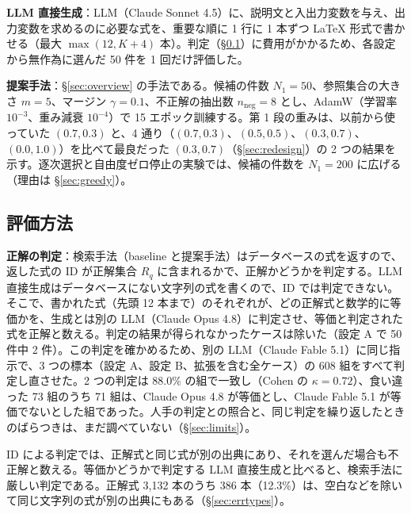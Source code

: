 \documentclass[a4j,dvipdfmx,11pt]{jresume}
\begin{document}
\textbf{LLM 直接生成}：LLM（Claude Sonnet 4.5）に、説明文と入出力変数を与え、出力変数を求めるのに必要な式を、重要な順に 1 行に 1 本ずつ \LaTeX{} 形式で書かせる（最大 $\max(12, K + 4)$ 本）。判定（\S\ref{sec:eval}）に費用がかかるため、各設定から無作為に選んだ 50 件を 1 回だけ評価した。

\textbf{提案手法}：\S\ref{sec:overview} の手法である。候補の件数 $N_1 = 50$、参照集合の大きさ $m = 5$、マージン $\gamma = 0.1$、不正解の抽出数 $n_{\mathrm{neg}} = 8$ とし、AdamW（学習率 $10^{-3}$、重み減衰 $10^{-4}$）で 15 エポック訓練する。第 1 段の重みは、以前から使っていた $(0.7, 0.3)$ と、4 通り（$(0.7, 0.3)$、$(0.5, 0.5)$、$(0.3, 0.7)$、$(0.0, 1.0)$）を比べて最良だった $(0.3, 0.7)$（\S\ref{sec:redesign}）の 2 つの結果を示す。逐次選択と自由度ゼロ停止の実験では、候補の件数を $N_1 = 200$ に広げる（理由は \S\ref{sec:greedy}）。

\subsection{評価方法}\label{sec:eval}
\textbf{正解の判定}：検索手法（baseline と提案手法）はデータベースの式を返すので、返した式の ID が正解集合 $R_q$ に含まれるかで、正解かどうかを判定する。LLM 直接生成はデータベースにない文字列の式を書くので、ID では判定できない。そこで、書かれた式（先頭 12 本まで）のそれぞれが、どの正解式と数学的に等価かを、生成とは別の LLM（Claude Opus 4.8）に判定させ、等価と判定された式を正解と数える。判定の結果が得られなかったケースは除いた（設定 A で 50 件中 2 件）。この判定を確かめるため、別の LLM（Claude Fable 5.1）に同じ指示で、3 つの標本（設定 A、設定 B、拡張を含む全ケース）の 608 組をすべて判定し直させた。2 つの判定は 88.0\% の組で一致し（Cohen の $\kappa = 0.72$）、食い違った 73 組のうち 71 組は、Claude Opus 4.8 が等価とし、Claude Fable 5.1 が等価でないとした組であった。人手の判定との照合と、同じ判定を繰り返したときのばらつきは、まだ調べていない（\S\ref{sec:limits}）。

ID による判定では、正解式と同じ式が別の出典にあり、それを選んだ場合も不正解と数える。等価かどうかで判定する LLM 直接生成と比べると、検索手法に厳しい判定である。正解式 3{,}132 本のうち 386 本（12.3\%）は、空白などを除いて同じ文字列の式が別の出典にもある（\S\ref{sec:errtypes}）。
\end{document}
